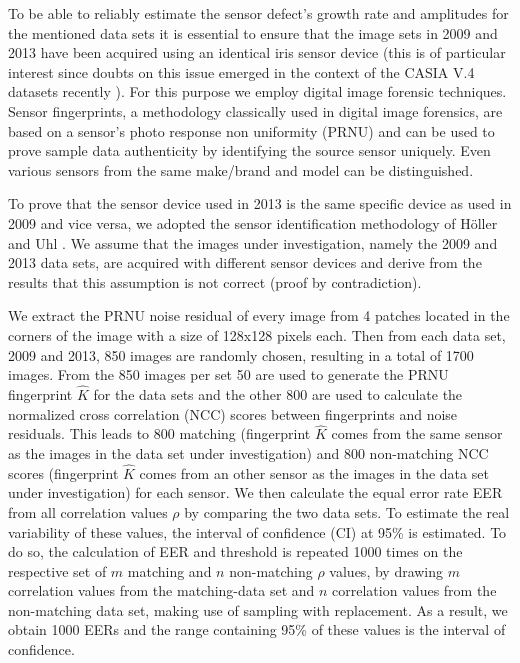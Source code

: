 \documentclass[10pt,twocolumn,letterpaper]{article}
\begin{document}
To be able to reliably estimate the sensor defect's growth rate and amplitudes for the mentioned data sets it is essential to ensure that the image sets in 2009 and 2013 have been acquired using an identical iris sensor device (this is of particular interest since doubts on this issue emerged in the context of the CASIA V.4 datasets recently \cite{Debiasi14a}). 
For this purpose we employ digital image forensic \cite{farid-spm-09} techniques. Sensor fingerprints, a methodology classically used in digital image forensics, are based on a sensor’s photo response non uniformity (PRNU) \cite{12696519,journals/tifs/ChenFGL08} and can be used to prove sample data authenticity by identifying the source sensor uniquely. Even various sensors from the same make/brand and model can be distinguished.

To prove that the sensor device used in 2013 is the same specific device as used in 2009 and vice versa, we adopted the sensor identification methodology of H\"oller and Uhl \cite{UhlH12}. 
We assume that the images under investigation, namely the 2009 and 2013 data sets, are acquired with different sensor devices and derive from the results that this assumption is not correct (proof by contradiction).

We extract the PRNU noise residual of every image from 4 patches located in the corners of the image with a size of 128x128 pixels each. Then from each data set, 2009 and 2013, 850 images are randomly chosen, resulting in a total of 1700 images. From the 850 images per set 50 are used to generate the PRNU fingerprint $\hat{K}$ for the data sets and the other 800 are used to calculate the normalized cross correlation (NCC) scores between fingerprints and noise residuals. 
This leads to 800 matching (fingerprint $\hat{K}$ comes from the same sensor as the images in the data set under investigation) and 800 non-matching NCC scores (fingerprint $\hat{K}$ comes from an other sensor as the images in the data set under investigation) for each sensor.
We then calculate the equal error rate EER from all correlation values $\rho$ by comparing the two data sets. To estimate the real variability of these values, the interval of confidence (CI) at 95\% is estimated. To do so, the calculation of EER and threshold is repeated 1000 times on the respective set of $m$ matching and $n$ non-matching $\rho$ values, by drawing $m$ correlation values from the matching-data set and $n$ correlation values from the non-matching data set, making use of sampling with replacement. As a result, we obtain 1000 EERs and the range containing 95\% of these values is the interval of confidence. 
\end{document}
